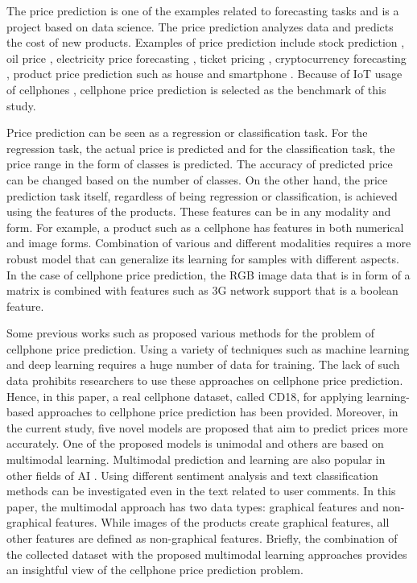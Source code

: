 \documentclass{svjour3}                     \smartqed  \usepackage{graphicx}
\begin{document}
The price prediction is one of the examples related to forecasting tasks and
is a project based on data science. The price prediction  analyzes data and predicts the cost of new products. Examples of price prediction include stock prediction \cite{Parmar2018,TeixeiraZavadzkidePauli2020,Singh2017,Karimuzzaman2021}, oil price \cite{SenGupta2021}, electricity price forecasting \cite{Vilar2018}, ticket pricing \cite{Abdella2019,Lantseva2015}, cryptocurrency forecasting \cite{Azari2019,Kadiroglu2019,Phaladisailoed2018,Lahmiri2019,Ji2019}, product price prediction such as house \cite{park2015using} and smartphone \cite{Chandrashekhara2019}. Because of IoT usage of cellphones \cite{Tien2017}, cellphone price prediction is selected as the benchmark of this study.  

Price prediction can be seen as a regression or classification task. For the regression task, the actual price is predicted and for the classification task, the price range in the form of classes is predicted. The accuracy of predicted price can be changed based on the number of classes.  On the other hand, the price prediction task itself, regardless of being regression or classification, is achieved using the features of the products. These features can be in any modality and form. For example, a product such as a cellphone has features in both numerical and image forms. Combination of various and different modalities requires a more robust model that can generalize its learning for samples with different aspects. In the case of cellphone price prediction, the RGB image data that is in form of a  matrix is combined with features such as 3G network support that is a boolean feature.

Some previous works such as \cite{Nasser2019,Asim2018,Chandrashekhara2019} proposed various methods for the problem of cellphone price prediction. Using a variety of techniques such as machine learning and deep learning requires a huge number of data for training. The lack of such data prohibits researchers to use these approaches on cellphone price prediction. Hence, in this paper, a real cellphone dataset, called CD18,  for applying learning-based approaches to cellphone price prediction has been provided. Moreover, in the current study, five novel models are proposed that aim to predict prices more accurately. One of the proposed models is unimodal and others are based on multimodal learning. Multimodal prediction and learning are also popular in other fields of AI \cite{asgari2020multimodal,nikzad2020berters}.
Using different sentiment analysis and text classification methods \cite{minaee2020deep,vasfisisi2013text} can be investigated even in the text related to user comments. In this paper, the multimodal approach has two data types: graphical features and non-graphical features. While images of the products create graphical features, all other features are defined as non-graphical features. Briefly, the combination of the collected dataset with the proposed multimodal learning approaches provides an insightful view of the cellphone price prediction problem.
\end{document}
